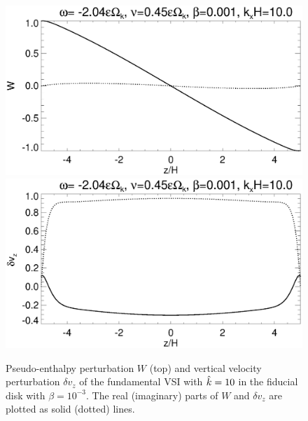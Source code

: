 \begin{figure}
  \includegraphics[width=\linewidth,clip=true,trim=0cm 1.75cm 0cm
  0cm]{figures/eigenvectorW_iso} 
  \includegraphics[width=\linewidth,clip=true,trim=0cm 0cm 0cm
  1cm]{figures/eigenvectorvz_iso}
  \caption{Pseudo-enthalpy perturbation $W$ (top) and vertical velocity
    perturbation $\delta v_z$ of the fundamental VSI with 
    $\hat{k}=10$ in the fiducial disk with $\beta=10^{-3}$. The real 
    (imaginary) parts of $W$ and $\delta v_z$ are plotted as solid
    (dotted) lines. 
    \label{lowfreq_eigenfunc}
  }
\end{figure}


